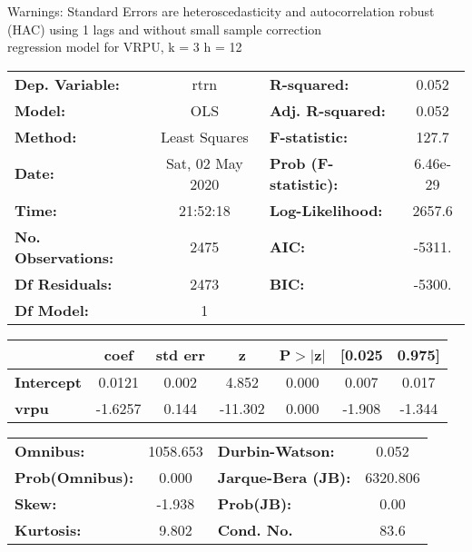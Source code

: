Warnings: \newline
 [1] Standard Errors are heteroscedasticity and autocorrelation robust (HAC) using 1 lags and without small sample correction\\ 

regression model for VRPU, k = 3 h = 12\begin{center}
\begin{tabular}{lclc}
\toprule
\textbf{Dep. Variable:}    &       rtrn       & \textbf{  R-squared:         } &     0.052   \\
\textbf{Model:}            &       OLS        & \textbf{  Adj. R-squared:    } &     0.052   \\
\textbf{Method:}           &  Least Squares   & \textbf{  F-statistic:       } &     127.7   \\
\textbf{Date:}             & Sat, 02 May 2020 & \textbf{  Prob (F-statistic):} &  6.46e-29   \\
\textbf{Time:}             &     21:52:18     & \textbf{  Log-Likelihood:    } &    2657.6   \\
\textbf{No. Observations:} &        2475      & \textbf{  AIC:               } &    -5311.   \\
\textbf{Df Residuals:}     &        2473      & \textbf{  BIC:               } &    -5300.   \\
\textbf{Df Model:}         &           1      & \textbf{                     } &             \\
\bottomrule
\end{tabular}
\begin{tabular}{lcccccc}
                   & \textbf{coef} & \textbf{std err} & \textbf{z} & \textbf{P$> |$z$|$} & \textbf{[0.025} & \textbf{0.975]}  \\
\midrule
\textbf{Intercept} &       0.0121  &        0.002     &     4.852  &         0.000        &        0.007    &        0.017     \\
\textbf{vrpu}      &      -1.6257  &        0.144     &   -11.302  &         0.000        &       -1.908    &       -1.344     \\
\bottomrule
\end{tabular}
\begin{tabular}{lclc}
\textbf{Omnibus:}       & 1058.653 & \textbf{  Durbin-Watson:     } &    0.052  \\
\textbf{Prob(Omnibus):} &   0.000  & \textbf{  Jarque-Bera (JB):  } & 6320.806  \\
\textbf{Skew:}          &  -1.938  & \textbf{  Prob(JB):          } &     0.00  \\
\textbf{Kurtosis:}      &   9.802  & \textbf{  Cond. No.          } &     83.6  \\
\bottomrule
\end{tabular}
\end{center}

